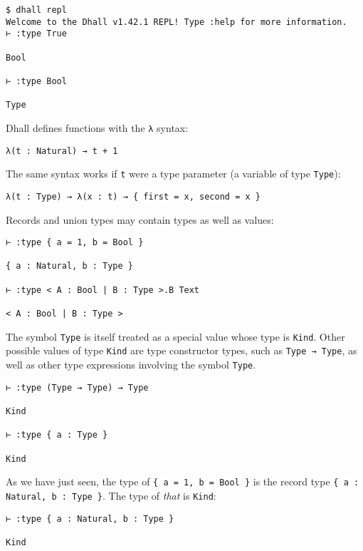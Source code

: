 \begin{lstlisting}[language=Dhall]
$ dhall repl
Welcome to the Dhall v1.42.1 REPL! Type :help for more information.
⊢ :type True

Bool

⊢ :type Bool

Type
\end{lstlisting}


Dhall defines functions with the \lstinline!λ! syntax:


\begin{lstlisting}[language=Dhall]
λ(t : Natural) → t + 1
\end{lstlisting}


The same syntax works if \lstinline!t! were a type parameter (a variable of type \lstinline!Type!):


\begin{lstlisting}[language=Dhall]
λ(t : Type) → λ(x : t) → { first = x, second = x }
\end{lstlisting}


Records and union types may contain types as well as values:


\begin{lstlisting}[language=Dhall]
⊢ :type { a = 1, b = Bool }

{ a : Natural, b : Type } 

⊢ :type < A : Bool | B : Type >.B Text

< A : Bool | B : Type >
\end{lstlisting}


The symbol \lstinline!Type! is itself treated as a special value whose type is \lstinline!Kind!.
Other possible values of type \lstinline!Kind! are type constructor types, such as \lstinline!Type → Type!, as well as other type expressions involving the symbol \lstinline!Type!.


\begin{lstlisting}[language=Dhall]
⊢ :type (Type → Type) → Type

Kind

⊢ :type { a : Type }

Kind
\end{lstlisting}


As we have just seen, the type of \lstinline!{ a = 1, b = Bool }! is the record type \lstinline!{ a : Natural, b : Type }!. The type of \emph{that} is \lstinline!Kind!:


\begin{lstlisting}[language=Dhall]
⊢ :type { a : Natural, b : Type }

Kind
\end{lstlisting}



